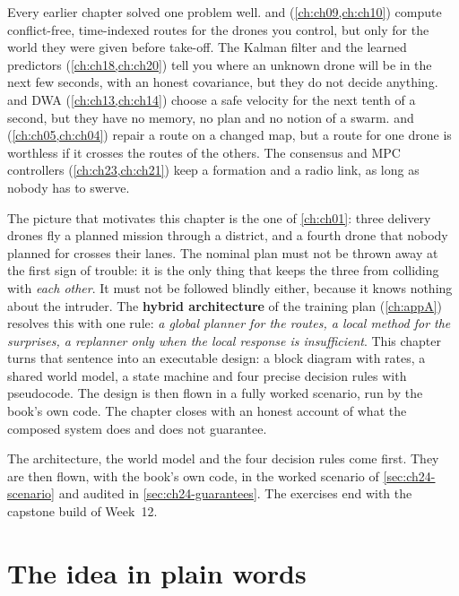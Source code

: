 Every earlier chapter solved one problem well. \cbs and \ecbs
(\cref{ch:ch09,ch:ch10}) compute conflict-free, time-indexed routes for the
drones you control, but only for the world they were given before take-off.
The Kalman filter and the learned predictors (\cref{ch:ch18,ch:ch20}) tell you
where an unknown drone will be in the next few seconds, with an honest
covariance, but they do not decide anything. \orca and DWA
(\cref{ch:ch13,ch:ch14}) choose a safe velocity for the next tenth of a second,
but they have no memory, no plan and no notion of a swarm. \dstarlite and
\astar (\cref{ch:ch05,ch:ch04}) repair a route on a changed map, but a route
for one drone is worthless if it crosses the routes of the others. The
consensus and MPC controllers (\cref{ch:ch23,ch:ch21}) keep a formation and a
radio link, as long as nobody has to swerve.

The picture that motivates this chapter is the one of \cref{ch:ch01}: three
delivery drones fly a planned mission through a district, and a fourth drone
that nobody planned for crosses their lanes. The nominal plan must not be
thrown away at the first sign of trouble: it is the only thing that keeps
the three from colliding with \emph{each other}. It must not be followed
blindly either, because it knows nothing about the intruder. The
\textbf{hybrid architecture} of the training plan
(\cref{ch:appA}) resolves this with one rule: \emph{a global planner for the
routes, a local method for the surprises, a replanner only when the local
response is insufficient}. This chapter turns that sentence into an
executable design: a block diagram with rates, a shared world model, a
state machine and four precise decision rules with pseudocode. The design
is then flown in a fully worked scenario, run by the book's own code. The
chapter closes with an honest account of what the composed system does and
does not guarantee.

The architecture, the world model and the four decision rules come first.
They are then flown, with the book's own code, in the worked scenario of
\cref{sec:ch24-scenario} and audited in \cref{sec:ch24-guarantees}. The
exercises end with the capstone build of Week~12.

\section{The idea in plain words}
\label{sec:ch24-intuition}

